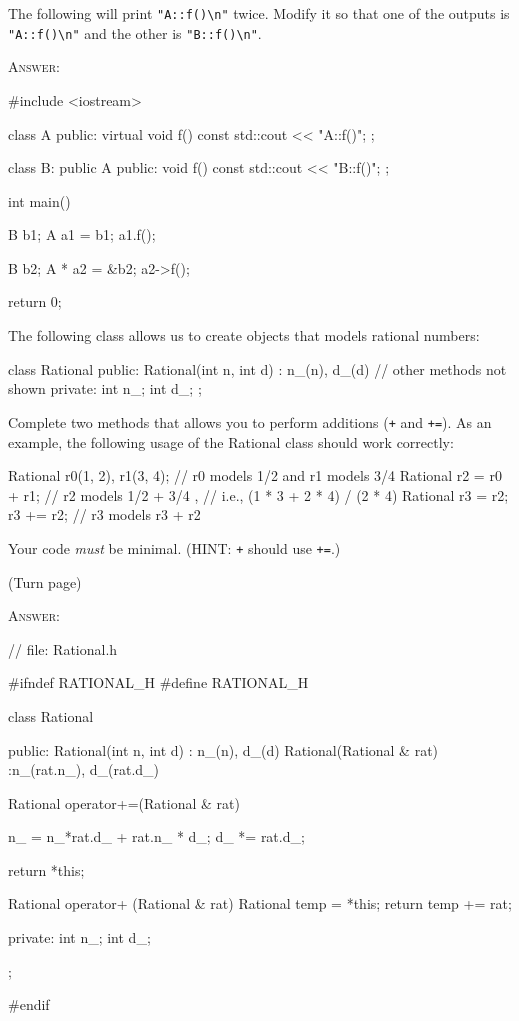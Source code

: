 \newpage
\nextq
The following will print \verb!"A::f()\n"! twice.
Modify it so that one of the outputs is
\verb!"A::f()\n"! and the other is \verb!"B::f()\n"!. 

\textsc{Answer:}
\begin{answercode}
#include <iostream>

class A
{
public:
    virtual void f() const
    {
        std::cout << "A::f()\n";
    }
};

class B: public A
{
public:
    void f() const
    {
        std::cout << "B::f()\n";
    }
};

int main()
{
    B b1;
    A a1 = b1; 
    a1.f();

    B b2;
    A * a2 = &b2;
    a2->f();

    return 0;
}
\end{answercode}

\newpage
\nextq
The following class allows us to create objects that models rational numbers:
\begin{console}
class Rational
{
public:
    Rational(int n, int d)
        : n_(n), d_(d)
    {}
    // other methods not shown
private:
    int n_;
    int d_;
};
\end{console}
Complete two methods that allows you to perform additions
(\verb!+! and \verb!+=!).
As an example, the following usage of the Rational class should work correctly:
\begin{console}
Rational r0(1, 2), r1(3, 4); // r0 models 1/2 and r1 models 3/4
Rational r2 = r0 + r1;       // r2 models 1/2 + 3/4 , 
                             // i.e., (1 * 3 + 2 * 4) / (2 * 4)
Rational r3 = r2;
r3 += r2;                    // r3 models r3 + r2
\end{console}
Your code \textit{must} be minimal.
(HINT: \verb!+! should use \verb!+=!.)

(Turn page)

\newpage
\textsc{Answer:}
\begin{answercode}
// file: Rational.h

#ifndef RATIONAL_H
#define RATIONAL_H

class Rational
{
public:
    Rational(int n, int d)
        : n_(n), d_(d)
    {}
    Rational(Rational & rat)
        :n_(rat.n_), d_(rat.d_)
    {}

    Rational operator+=(Rational & rat)
    {
        n_ = n_*rat.d_ + rat.n_ * d_;
        d_ *= rat.d_;

        return *this;        
    }
    Rational operator+ (Rational & rat)
    {
        Rational temp = *this;
        return temp += rat; 
    }
    
private:
    int n_;
    int d_;
};

#endif
\end{answercode}



